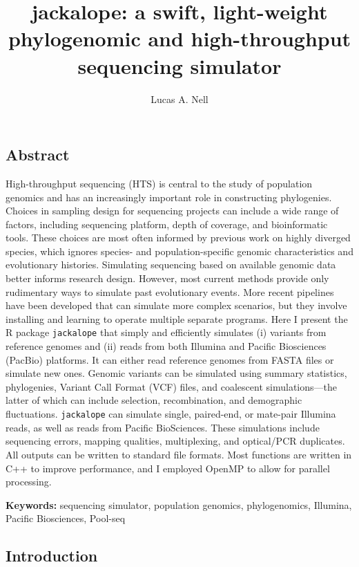 \documentclass[12pt,]{article}
\title{
    jackalope: a swift, light-weight phylogenomic and high-throughput sequencing simulator
            }
\author[1]{Lucas A. Nell}
\affil[1]{Department of Integrative Biology, University of Wisconsin--Madison}
\date{}
\makeatletter
\def\maketitle{{%
  \renewenvironment{tabular}[2][]
    {\begin{flushleft}}
    {\end{flushleft}}
  \AB@maketitle}}
\makeatother
\begin{document}
            \maketitle
        



\raggedright

\hypertarget{abstract}{%
\subsection{Abstract}\label{abstract}}

High-throughput sequencing (HTS) is central to the study of population genomics
and has an increasingly important role in constructing phylogenies.
Choices in sampling design for sequencing projects can include
a wide range of factors, including sequencing platform, depth of coverage, and
bioinformatic tools.
These choices are most often informed by previous work on highly diverged species,
which ignores species- and population-specific genomic characteristics
and evolutionary histories.
Simulating sequencing based on available genomic data better informs research design.
However, most current methods provide only rudimentary ways to simulate past
evolutionary events.
More recent pipelines have been developed that can simulate more complex scenarios,
but they involve installing and learning to operate multiple separate programs.
Here I present the R package \texttt{jackalope} that simply and efficiently simulates
(i) variants from reference genomes and
(ii) reads from both Illumina and Pacific Biosciences (PacBio) platforms.
It can either read reference genomes from FASTA files or simulate new ones.
Genomic variants can be simulated using summary statistics, phylogenies,
Variant Call Format (VCF) files, and coalescent simulations---the latter of which can
include selection, recombination, and demographic fluctuations.
\texttt{jackalope} can simulate single, paired-end, or mate-pair Illumina reads,
as well as reads from Pacific BioSciences.
These simulations include sequencing errors, mapping qualities, multiplexing,
and optical/PCR duplicates.
All outputs can be written to standard file formats.
Most functions are written in C++ to improve performance, and I employed OpenMP to
allow for parallel processing.

\textbf{Keywords:} sequencing simulator, population genomics, phylogenomics,
Illumina, Pacific Biosciences, Pool-seq

\hypertarget{introduction}{%
\subsection{Introduction}\label{introduction}}
\end{document}
